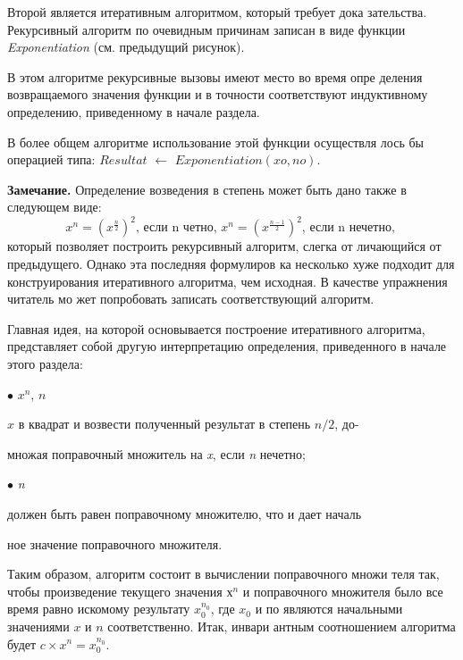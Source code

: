 Второй является итеративным алгоритмом, который требует дока­
зательства. Рекурсивный алгоритм по очевидным причинам записан в
виде функции \textit{Exponentiation} (см. предыдущий рисунок).

В этом алгоритме рекурсивные вызовы имеют место во время опре­
деления возвращаемого значения функции и в точности соответствуют
индуктивному определению, приведенному в начале раздела.

В более общем алгоритме использование этой функции осуществля­
лось бы операцией типа: \textit{$Resultat$} $\leftarrow$ \textit{$Exponentiation(xo,no)$}.
\newline
\begin{center}
\parbox{11cm}
{
\textbf{Замечание.} Определение возведения в степень может быть дано
также в следующем виде:
\begin{equation*}
x^{n} = (x^{ \frac{n}{2} }) ^ {2} \text{, если n четно, } x^{n} = (x^{ \frac{n-1}{2} }) ^ {2}  \text{, если n нечетно, }
\end{equation*}
который позволяет построить рекурсивный алгоритм, слегка от­
личающийся от предыдущего. Однако эта последняя формулиров­
ка несколько хуже подходит для конструирования итеративного
алгоритма, чем исходная. В качестве упражнения читатель мо­
жет попробовать записать соответствующий алгоритм.
}
\end{center}
Главная идея, на которой основывается построение итеративного
алгоритма, представляет собой другую интерпретацию определения,
приведенного в начале этого раздела:

\parindent=1.2cm $\bullet$  \textit{$x^{n}$},  \textit{$n$} 

\parindent=1.2cm  \textit{$x$} в квадрат и возвести полученный результат в степень \textit{$n/2$}, до-

\parindent=1.2cm множая поправочный множитель на \textit{x}, если \textit{n} нечетно;

\parindent=1.2cm $\bullet$  \textit{n} 

\parindent=1.2cm должен быть равен поправочному множителю, что и дает началь­

\parindent=1.2cm ное значение поправочного множителя.

\noindent Таким образом, алгоритм состоит в вычислении поправочного множи­
теля так, чтобы произведение текущего значения \textit{$х^{n}$} и поправочного
множителя было все время равно искомому результату \textit{$x_{0}^{n_{0}}$}, где \textit{$x_{0}$} и по
являются начальными значениями \textit{$x$} и \textit{$n$} соответственно. Итак, инвари­
антным соотношением алгоритма будет \textit{$c \times x^{n} = x_0^{n_0}$}.
\pagebreak


